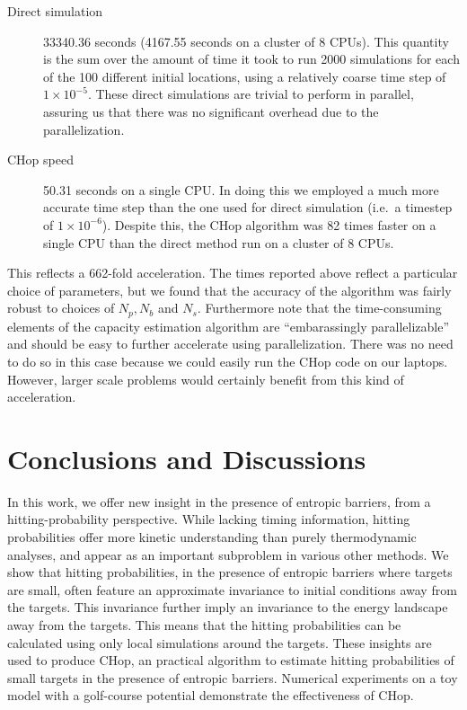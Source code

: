 \documentclass[english, aip, jcp, priprint, graphicx,floatfix]{revtex4-1}
\theoremstyle{plain}
\theoremstyle{definition}
\theoremstyle{plain}
\begin{document}
\begin{description}
\item[Direct simulation] 33340.36 seconds (4167.55 seconds on a cluster of 8 CPUs).  This quantity is the sum over the amount of time it took to run 2000 simulations for each of the 100 different initial locations, using a relatively coarse time step of $1 \times 10^{-5}$.  These direct simulations are trivial to perform in parallel, assuring us that there was no significant overhead due to the parallelization.

\item[CHop speed] 50.31 seconds on a single CPU. In doing this we employed a much more accurate time step than the one used for direct simulation (i.e.\ a timestep of $1 \times 10^{-6}$). Despite this, the CHop algorithm was 82 times faster on a single CPU than the direct method run on a cluster of 8 CPUs.

\end{description}

This reflects a 662-fold acceleration. The times reported above reflect a particular choice of parameters, but we found that the accuracy of the algorithm was fairly robust to choices of $N_p, N_b$ and $N_s$. Furthermore note that the time-consuming elements of the capacity estimation algorithm are ``embarassingly parallelizable'' and should be easy to further accelerate using parallelization.  There was no need to do so in this case because we could easily run the CHop code on our laptops.  However, larger scale problems would certainly benefit from this kind of acceleration.
\section{Conclusions and Discussions}\label{sec:discussion}

In this work, we offer new insight in the presence of entropic barriers, from a hitting-probability perspective. While lacking timing information, hitting probabilities offer more kinetic understanding than purely thermodynamic analyses, and appear as an important subproblem in various other methods. We show that hitting probabilities, in the presence of entropic barriers where targets are small, often feature an approximate invariance to initial conditions away from the targets. This invariance further imply an invariance to the energy landscape away from the targets. This means that the hitting probabilities can be calculated using only local simulations around the targets. These insights are used to produce CHop, an practical algorithm to estimate hitting probabilities of small targets in the presence of entropic barriers. Numerical experiments on a toy model with a golf-course potential demonstrate the effectiveness of CHop.
\end{document}
